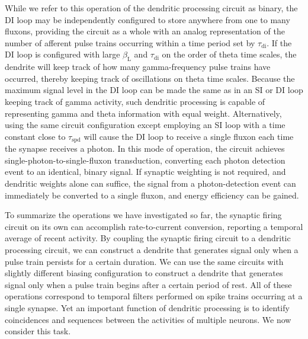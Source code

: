 \documentclass[twocolumn]{article}
\begin{document}
While we refer to this operation of the dendritic processing circuit as binary, the DI loop may be independently configured to store anywhere from one to many fluxons, providing the circuit as a whole with an analog representation of the number of afferent pulse trains occurring within a time period set by $\tau_{\mathrm{di}}$. If the DI loop is configured with large $\beta_{\mathrm{L}}$ and $\tau_{\mathrm{di}}$ on the order of theta time scales, the dendrite will keep track of how many gamma-frequency pulse trains have occurred, thereby keeping track of oscillations on theta time scales. Because the maximum signal level in the DI loop can be made the same as in an SI or DI loop keeping track of gamma activity, such dendritic processing is capable of representing gamma and theta information with equal weight. Alternatively, using the same circuit configuration except employing an SI loop with a time constant close to $\tau_{\mathrm{spd}}$ will cause the DI loop to receive a single fluxon each time the synapse receives a photon. In this mode of operation, the circuit achieves single-photon-to-single-fluxon transduction, converting each photon detection event to an identical, binary signal. If synaptic weighting is not required, and dendritic weights alone can suffice, the signal from a photon-detection event can immediately be converted to a single fluxon, and energy efficiency can be gained.

To summarize the operations we have investigated so far, the synaptic firing circuit on its own can accomplish rate-to-current conversion, reporting a temporal average of recent activity. By coupling the synaptic firing circuit to a dendritic processing circuit, we can construct a dendrite that generates signal only when a pulse train persists for a certain duration. We can use the same circuits with slightly different biasing configuration to construct a dendrite that generates signal only when a pulse train begins after a certain period of rest. All of these operations correspond to temporal filters performed on spike trains occurring at a single synapse. Yet an important function of dendritic processing is to identify coincidences and sequences between the activities of multiple neurons. We now consider this task.
\end{document}
